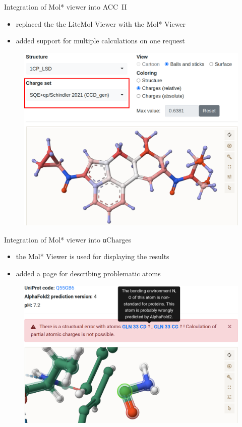 \documentclass[
]{beamer}
\begin{document}
\begin{frame}{Integration of Mol* viewer into ACC~II}
  \begin{itemize}
    \item replaced the the LiteMol Viewer with the Mol* Viewer
    \item added support for multiple calculations on one request
  \end{itemize}
  \begin{figure}
    \includegraphics[width=1\textwidth,height=0.78\textheight,keepaspectratio]{images/acc2-cropped.png}
  \end{figure}
\end{frame}

\begin{frame}{Integration of Mol* viewer into αCharges}
  \begin{itemize}
    \item the Mol* Viewer is used for displaying the results
    \item added a page for describing problematic atoms
  \end{itemize}
  \begin{figure}
    \includegraphics[width=1\textwidth,height=0.75\textheight,keepaspectratio]{images/focus.png}
  \end{figure}
  \end{frame}
\end{document}
